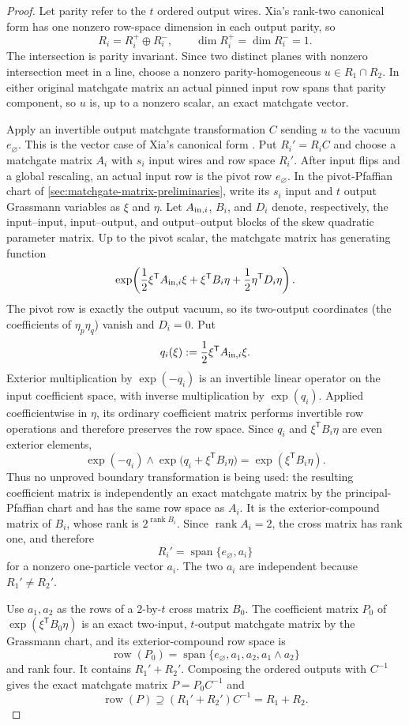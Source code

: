 \documentclass[11pt]{article}
\theoremstyle{definition}
\theoremstyle{remark}
\newcommand{\trans}{\mathsf T}
\newcommand{\row}{\operatorname{row}}
\newcommand{\Span}{\operatorname{span}}
\newcommand{\rank}{\operatorname{rank}}
\begin{document}
\begin{proof}
Let parity refer to the $t$ ordered output wires.  Xia's rank-two
canonical form has one nonzero row-space dimension in each output parity,
so
\[
  R_i=R_i^+\oplus R_i^-,
  \qquad \dim R_i^+=\dim R_i^-=1.
\]
The intersection is parity invariant.  Since two distinct planes with
nonzero intersection meet in a line, choose a nonzero parity-homogeneous
$u\in R_1\cap R_2$.  In either original matchgate matrix an actual pinned
input row spans that parity component, so $u$ is, up to a nonzero scalar,
an exact matchgate vector.

Apply an invertible output matchgate transformation $C$ sending
$u$ to the vacuum $e_\varnothing$.  This is the vector case of Xia's
canonical form \cite[Theorem~4.1]{Xia2016}.  Put $R_i'=R_iC$ and choose a
matchgate matrix $A_i$ with $s_i$ input wires and row space $R_i'$.  After
input flips and a global rescaling, an actual input row is the pivot row
$e_\varnothing$.  In the pivot-Pfaffian chart of
\cref{sec:matchgate-matrix-preliminaries}, write its $s_i$ input and $t$
output Grassmann variables as $\xi$ and $\eta$.  Let $A_{{\rm in},i}$,
$B_i$, and $D_i$ denote,
respectively, the input--input, input--output, and output--output blocks of
the skew quadratic parameter matrix.  Up to the pivot scalar, the matchgate
matrix has generating function
\[
  \exp\!\left(
    \frac12\xi^{\trans}A_{{\rm in},i}\xi
    +\xi^{\trans}B_i\eta
    +\frac12\eta^{\trans}D_i\eta
  \right).
\]
The pivot row is exactly the output vacuum, so its two-output coordinates
(the coefficients of $\eta_p\eta_q$) vanish and $D_i=0$.  Put
\[
  q_i(\xi):=\frac12\xi^{\trans}A_{{\rm in},i}\xi.
\]
Exterior multiplication by $\exp(-q_i)$ is an invertible linear operator
on the input coefficient space, with inverse multiplication by
$\exp(q_i)$.  Applied coefficientwise in $\eta$, its ordinary coefficient
matrix performs invertible row operations and therefore preserves the row
space.  Since $q_i$ and $\xi^{\trans}B_i\eta$ are even exterior elements,
\[
  \exp(-q_i)\wedge
  \exp\bigl(q_i+\xi^{\trans}B_i\eta\bigr)
  =\exp(\xi^{\trans}B_i\eta).
\]
Thus no unproved boundary transformation is being used: the resulting
coefficient matrix is independently an exact matchgate matrix by the
principal-Pfaffian chart and has the same row space as $A_i$.  It is the
exterior-compound matrix of $B_i$, whose rank is $2^{\rank B_i}$.  Since
$\rank A_i=2$, the cross matrix has rank one, and therefore
\[
  R_i'=\Span\{e_\varnothing,a_i\}
\]
for a nonzero one-particle vector $a_i$.  The two $a_i$ are independent
because $R_1'\ne R_2'$.

Use $a_1,a_2$ as the rows of a $2$-by-$t$ cross matrix $B_0$.  The
coefficient matrix $P_0$ of $\exp(\xi^{\trans}B_0\eta)$ is an exact
two-input, $t$-output matchgate matrix by the Grassmann chart, and its
exterior-compound row space is
\[
  \row(P_0)=
  \Span\{e_\varnothing,a_1,a_2,a_1\wedge a_2\}
\]
and rank four.  It contains $R_1'+R_2'$.  Composing the ordered outputs
with $C^{-1}$ gives the exact matchgate matrix $P=P_0C^{-1}$ and
\[
  \row(P)\supseteq(R_1'+R_2')C^{-1}=R_1+R_2.
\]
\end{proof}
\end{document}
